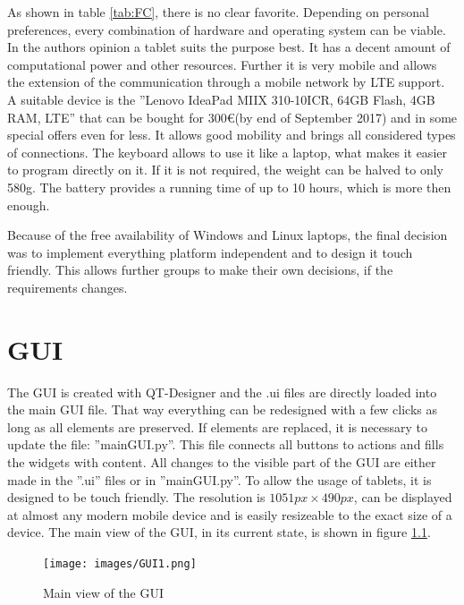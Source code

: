 \documentclass[]{scrreprt}
\begin{document}
	As shown in table \ref{tab:FC}, there is no clear favorite. Depending on personal preferences, every combination of hardware and operating system can be viable. In the authors opinion a tablet suits the purpose best. It has a decent amount of computational power and other resources. Further it is very mobile and allows the extension of the communication through a mobile network by LTE support. A suitable device is the ''Lenovo IdeaPad MIIX 310-10ICR, 64GB Flash, 4GB RAM, LTE'' that can be bought for 300\euro (by end of September 2017) and in some special offers even for less. It allows good mobility and brings all considered types of connections. The keyboard allows to use it like a laptop, what makes it easier to program directly on it. If it is not required, the weight can be halved to only 580g. The battery provides a running time of up to 10 hours, which is more then enough.
	
	Because of the free availability of Windows and Linux laptops, the final decision was to implement everything platform independent and to design it touch friendly. This allows further groups to make their own decisions, if the requirements changes.
	
	
\chapter{GUI}
	The GUI is created with QT-Designer and the .ui files are directly loaded into the main GUI file. That way everything can be redesigned with a few clicks as long as all elements are preserved. If elements are replaced, it is necessary to update the file: ''mainGUI.py''. This file connects all buttons to actions and fills the widgets with content. All changes to the visible part of the GUI are either made in the ''.ui'' files or in ''mainGUI.py''. To allow the usage of tablets, it is designed to be touch friendly. The resolution is $1051px \times 490px$, can be displayed at almost any modern mobile device and is easily resizeable to the exact size of a device. The main view of the GUI, in its current state, is shown in figure \ref{fig:GUI1}.
	
	\begin{figure}[H]
		\centering
		\texttt{[image: images/GUI1.png]}
		\caption{Main view of the GUI} \label{fig:GUI1}
	\end{figure}
\end{document}
